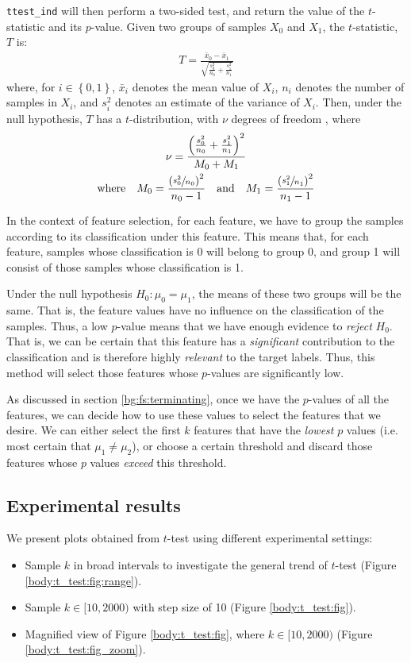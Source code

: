 \documentclass[12pt, twoside, a4paper]{report}
\begin{document}
\texttt{ttest\_ind} will then perform a two-sided test, and return the value of the $t$-statistic and its $p$-value. Given two groups of samples $X_0$ and $X_1$, the $t$-statistic, $T$ is:
\begin{align*}
T = \frac{\bar{x}_0 - \bar{x}_1}{\sqrt{\frac{s_0^2}{n_0} + \frac{s_1^2}{n_1}}}
\end{align*}
where, for $i \in \left\lbrace 0,1 \right\rbrace$, $\bar{x}_i$ denotes the mean value of $X_i$, $n_i$ denotes the number of samples in $X_i$, and $s_i^2$ denotes an estimate of the variance of $X_i$. Then, under the null hypothesis, $T$ has a $t$-distribution, with $\nu$ degrees of freedom \cite{RefWorks:219}, where
\begin{gather*}
\nu = \frac{\left( \frac{s_0^2}{n_0} + \frac{s_1^2}{n_1} \right)^2}{ M_0 + M_1 } \\
\text{where} \quad M_0 = \frac{\left(\sfrac{s_0^2}{n_0}\right)^2}{n_0-1} \quad \text{and} \quad
M_1 = \frac{\left(\sfrac{s_1^2}{n_1}\right)^2}{n_1-1}
\end{gather*}

In the context of feature selection, for each feature, we have to group the samples according to its classification under this feature. This means that, for each feature, samples whose classification is 0 will belong to group 0, and group 1 will consist of those samples whose classification is 1.

Under the null hypothesis $H_0: \mu_0 = \mu_1$, the means of these two groups will be the same. That is, the feature values have no influence on the classification of the samples. Thus, a low $p$-value means that we have enough evidence to \textit{reject} $H_0$. That is, we can be certain that this feature has a \textit{significant} contribution to the classification and is therefore highly \textit{relevant} to the target labels. Thus, this method will select those features whose $p$-values are significantly low.

As discussed in section \ref{bg:fs:terminating}, once we have the $p$-values of all the features, we can decide how to use these values to select the features that we desire. We can either select the first $k$ features that have the \textit{lowest} $p$ values (i.e. most certain that $\mu_1 \neq \mu_2$), or choose a certain threshold and discard those features whose $p$ values \textit{exceed} this threshold.

\subsection{Experimental results}
We present plots obtained from $t$-test using different experimental settings:
\begin{itemize}
  \item Sample $k$ in broad intervals to investigate the general trend of $t$-test (Figure \ref{body:t_test:fig:range}).
  \item Sample $k\in [10,2000)$ with step size of 10 (Figure \ref{body:t_test:fig}).
  \item Magnified view of Figure \ref{body:t_test:fig}, where $k \in [10,2000)$ (Figure \ref{body:t_test:fig_zoom}).
\end{itemize}
\end{document}
